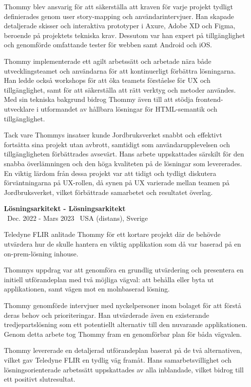 \documentclass[a4paper,10pt]{article}
\begin{document}
Thommy blev ansvarig för att säkerställa att kraven för varje projekt tydligt definierades genom user story-mapping och användarintervjuer. Han skapade detaljerade skisser och interaktiva prototyper i Axure, Adobe XD och Figma, beroende på projektets tekniska krav. Dessutom var han expert på tillgänglighet och genomförde omfattande tester för webben samt Android och iOS.

Thommy implementerade ett agilt arbetssätt och arbetade nära både utvecklingsteamet och användarna för att kontinuerligt förbättra lösningarna. Han ledde också workshops för att öka teamets förståelse för UX och tillgänglighet, samt för att säkerställa att rätt verktyg och metoder användes. Med sin tekniska bakgrund bidrog Thommy även till att stödja frontend-utvecklare i utformandet av hållbara lösningar för HTML-semantik och tillgänglighet.

Tack vare Thommys insatser kunde Jordbruksverket snabbt och effektivt fortsätta sina projekt utan avbrott, samtidigt som användarupplevelsen och tillgängligheten förbättrades avsevärt. Hans arbete uppskattades särskilt för den snabba överlämningen och den höga kvaliteten på de lösningar som levererades. En viktig lärdom från dessa projekt var att tidigt och tydligt diskutera förväntningarna på UX-rollen, då synen på UX varierade mellan teamen på Jordbruksverket, vilket förbättrade samarbetet och resultatet överlag.

\vspace{0.5cm}
\textbf{Lösningsarkitekt - Lösningsarkitekt}\\
\normalsize \faCalendar \ Dec. 2022 - Mars 2023 \quad \faMapMarker \ USA (distans), Sverige

Teledyne FLIR anlitade Thommy för ett kortare projekt där de behövde utvärdera hur de skulle hantera en viktig applikation som då var baserad på en on-prem-lösning inhouse.

Thommys uppdrag var att genomföra en grundlig utvärdering och presentera en initiell utförandeplan med två möjliga vägval: att behålla eller byta ut applikationen, samt vägen mot en molnbaserad lösning.

Thommy genomförde intervjuer med nyckelpersoner inom bolaget för att förstå deras behov och prioriteringar. Han utvärderade även en existerande tredjepartslösning som ett potentiellt alternativ till den nuvarande applikationen. Genom detta arbete tog Thommy fram en genomförbar plan för båda vägvalen.

Thommy levererade en detaljerad utförandeplan baserat på de två alternativen, vilket gav Teledyne FLIR en tydlig väg framåt. Hans samarbetsvillighet och lösningsorienterade arbetssätt uppskattades av alla inblandade, vilket bidrog till ett positivt slutresultat.
\end{document}
